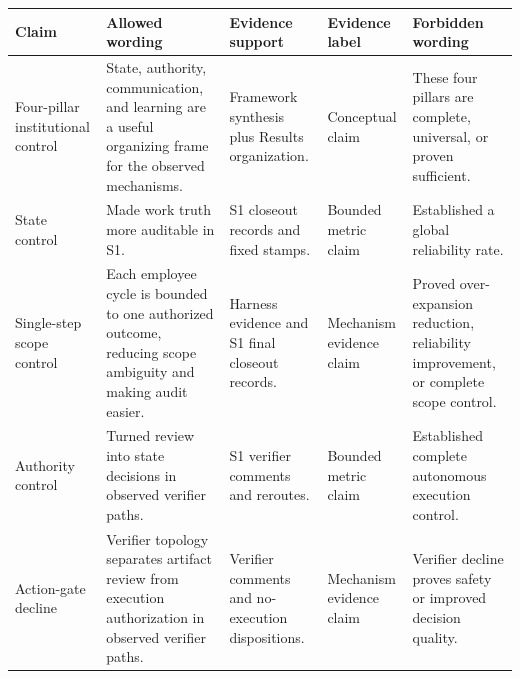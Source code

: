 \documentclass[
]{article}
\newcounter{none} %
\begin{document}
{\def\LTcaptype{none} %
\begin{longtable}[]{@{}
  >{\raggedright\arraybackslash}p{}
  >{\raggedright\arraybackslash}p{}
  >{\raggedright\arraybackslash}p{}
  >{\raggedright\arraybackslash}p{}
  >{\raggedright\arraybackslash}p{}@{}}
\toprule\noalign{}
\begin{minipage}[b]{\linewidth}\raggedright
Claim
\end{minipage} & \begin{minipage}[b]{\linewidth}\raggedright
Allowed wording
\end{minipage} & \begin{minipage}[b]{\linewidth}\raggedright
Evidence support
\end{minipage} & \begin{minipage}[b]{\linewidth}\raggedright
Evidence label
\end{minipage} & \begin{minipage}[b]{\linewidth}\raggedright
Forbidden wording
\end{minipage} \\
\midrule\noalign{}
\endhead
\bottomrule\noalign{}
\endlastfoot
Four-pillar institutional control & State, authority, communication, and learning are a useful organizing frame for the observed mechanisms. & Framework synthesis plus Results organization. & Conceptual claim & These four pillars are complete, universal, or proven sufficient. \\
State control & Made work truth more auditable in S1. & S1 closeout records and fixed stamps. & Bounded metric claim & Established a global reliability rate. \\
Single-step scope control & Each employee cycle is bounded to one authorized outcome, reducing scope ambiguity and making audit easier. & Harness evidence and S1 final closeout records. & Mechanism evidence claim & Proved over-expansion reduction, reliability improvement, or complete scope control. \\
Authority control & Turned review into state decisions in observed verifier paths. & S1 verifier comments and reroutes. & Bounded metric claim & Established complete autonomous execution control. \\
Action-gate decline & Verifier topology separates artifact review from execution authorization in observed verifier paths. & Verifier comments and no-execution dispositions. & Mechanism evidence claim & Verifier decline proves safety or improved decision quality. \\

\end{longtable}}
\end{document}

